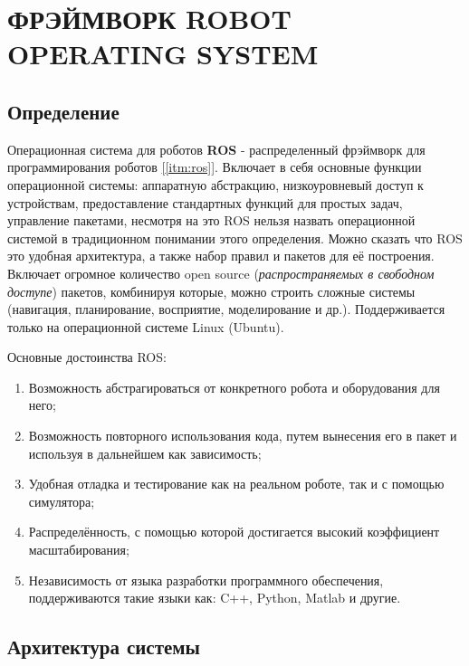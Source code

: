 \chapter{ФРЭЙМВОРК ROBOT OPERATING SYSTEM}

\section{Определение}

Операционная система для роботов \textbf{ROS} - распределенный фрэймворк для программирования роботов \hyperref[itm:ros]{[\ref{itm:ros}]}. Включает в себя основные функции операционной системы: аппаратную абстракцию, низкоуровневый доступ к устройствам, предоставление стандартных функций для простых задач, управление пакетами, несмотря на это ROS нельзя назвать операционной системой в традиционном понимании этого определения. Можно сказать что ROS это удобная архитектура, а также набор правил и пакетов для её построения. Включает огромное количество open source (\textit{распространяемых в свободном доступе}) пакетов, комбинируя которые, можно строить сложные системы (навигация, планирование, восприятие, моделирование и др.). Поддерживается только на операционной системе Linux (Ubuntu).

\vspace{1em}
Основные достоинства ROS: 
\begin{enumerate}
    \item Возможность абстрагироваться от конкретного робота и оборудования для него;
    \item Возможность повторного использования кода, путем вынесения его в пакет и используя в дальнейшем как зависимость;
    \item Удобная отладка и тестирование как на реальном роботе, так и с помощью симулятора;
    \item Распределённость, с помощью которой достигается высокий коэффициент масштабирования;
    \item Независимость от языка разработки программного обеспечения, поддерживаются такие языки как: C++, Python, Matlab и другие.
\end{enumerate}

\section{Архитектура системы}

